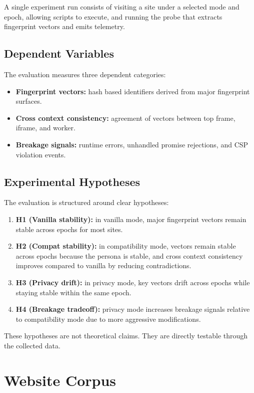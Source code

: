 \documentclass[11pt]{report}
\begin{document}
A single experiment run consists of visiting a site under a selected mode and epoch, allowing scripts to execute, and running the probe that extracts fingerprint vectors and emits telemetry.

\subsection{Dependent Variables}

The evaluation measures three dependent categories:

\begin{itemize}
    \item \textbf{Fingerprint vectors:} hash based identifiers derived from major fingerprint surfaces.
    \item \textbf{Cross context consistency:} agreement of vectors between top frame, iframe, and worker.
    \item \textbf{Breakage signals:} runtime errors, unhandled promise rejections, and CSP violation events.
\end{itemize}

\subsection{Experimental Hypotheses}

The evaluation is structured around clear hypotheses:

\begin{enumerate}
    \item \textbf{H1 (Vanilla stability):} in vanilla mode, major fingerprint vectors remain stable across epochs for most sites.
    \item \textbf{H2 (Compat stability):} in compatibility mode, vectors remain stable across epochs because the persona is stable, and cross context consistency improves compared to vanilla by reducing contradictions.
    \item \textbf{H3 (Privacy drift):} in privacy mode, key vectors drift across epochs while staying stable within the same epoch.
    \item \textbf{H4 (Breakage tradeoff):} privacy mode increases breakage signals relative to compatibility mode due to more aggressive modifications.
\end{enumerate}

These hypotheses are not theoretical claims. They are directly testable through the collected data.

\section{Website Corpus}
\end{document}
